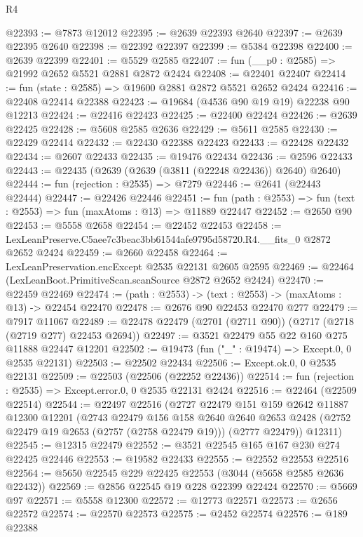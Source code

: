 \begin{lexlean}{R4}
\begin{coremodule}
@22393 := @7873 @12012
@22395 := @2639 @22393 @2640
@22397 := @2639 @22395 @2640
@22398 := @22392 @22397
@22399 := @5384 @22398
@22400 := @2639 @22399
@22401 := @5529 @2585
@22407 := fun (__p0 : @2585) => @21992 @2652 @5521 @2881 @2872 @2424
@22408 := @22401 @22407
@22414 := fun (state : @2585) => @19600 @2881 @2872 @5521 @2652 @2424
@22416 := @22408 @22414 @22388
@22423 := @19684 (@4536 @90 @19 @19) @22238 @90 @12213
@22424 := @22416 @22423
@22425 := @22400 @22424
@22426 := @2639 @22425
@22428 := @5608 @2585 @2636
@22429 := @5611 @2585
@22430 := @22429 @22414
@22432 := @22430 @22388 @22423
@22433 := @22428 @22432
@22434 := @2607 @22433
@22435 := @19476 @22434
@22436 := @2596 @22433
@22443 := @22435 (@2639 (@2639 (@3811 (@22248 @22436)) @2640) @2640)
@22444 := fun (rejection : @2535) => @7279
@22446 := @2641 (@22443 @22444)
@22447 := @22426 @22446
@22451 := fun (path : @2553) => fun (text : @2553) => fun (maxAtoms : @13) => @11889 @22447
@22452 := @2650 @90
@22453 := @5558 @2658
@22454 := @22452 @22453
@22458 := LexLeanPreserve.C5aee7c3beac3bb61544afe9795d58720.R4.__fits_0 @2872 @2652 @2424
@22459 := @2660 @22458
@22464 := LexLeanPreservation.encExcept @2535 @22131 @2605 @2595
@22469 := @22464 (LexLeanBoot.PrimitiveScan.scanSource @2872 @2652 @2424)
@22470 := @22459 @22469
@22474 := (path : @2553) -> (text : @2553) -> (maxAtoms : @13) -> @22454 @22470
@22478 := @2676 @90 @22453 @22470 @277
@22479 := @7917 @11067
@22489 := @22478 @22479 (@2701 (@2711 @90)) (@2717 (@2718 (@2719 @277) @22453 @2694))
@22497 := @3521 @22479 @55 @22 @160 @275 @11888 @22447 @12201
@22502 := @19473 (fun ("_" : @19474) => Except.{0, 0} @2535 @22131)
@22503 := @22502 @22434
@22506 := Except.ok.{0, 0} @2535 @22131
@22509 := @22503 (@22506 (@22252 @22436))
@22514 := fun (rejection : @2535) => Except.error.{0, 0} @2535 @22131 @2424
@22516 := @22464 (@22509 @22514)
@22544 := @22497
    @22516
    (@2727
      @22479
      @151
      @159
      @2642
      @11887
      @12300
      @12201
      (@2743
        @22479
        @156
        @158
        @2640
        @2640
        @2653
        @2428
        (@2752 @22479 @19 @2653 (@2757 (@2758 @22479 @19)))
        (@2777 @22479))
      @12311)
@22545 := @12315 @22479
@22552 := @3521 @22545 @165 @167 @230 @274 @22425 @22446
@22553 := @19582 @22433
@22555 := @22552 @22553 @22516
@22564 := @5650 @22545 @229 @22425 @22553 (@3044 (@5658 @2585 @2636 @22432))
@22569 := @2856 @22545 @19 @228 @22399 @22424
@22570 := @5669 @97
@22571 := @5558 @12300
@22572 := @12773 @22571
@22573 := @2656 @22572
@22574 := @22570 @22573
@22575 := @2452 @22574
@22576 := @189 @22388

\end{coremodule}
\end{lexlean}
